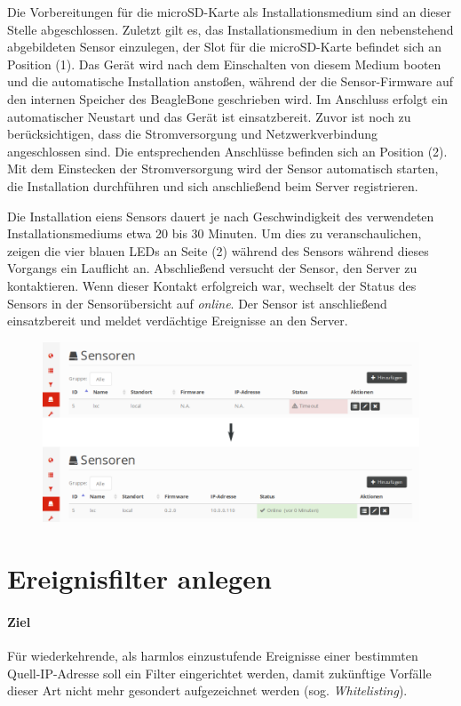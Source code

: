 \documentclass[12pt]{article}
\begin{document}
Die Vorbereitungen für die microSD-Karte als Installationsmedium sind an dieser Stelle abgeschlossen. Zuletzt gilt es, das Installationsmedium in den nebenstehend abgebildeten Sensor einzulegen, der Slot für die microSD-Karte befindet sich an Position (1). Das Gerät wird nach dem Einschalten von diesem Medium booten und die automatische Installation anstoßen, während der die Sensor-Firmware auf den internen Speicher des BeagleBone geschrieben wird. Im Anschluss erfolgt ein automatischer Neustart und das Gerät ist einsatzbereit. Zuvor ist noch zu berücksichtigen, dass die Stromversorgung und Netzwerkverbindung angeschlossen sind. Die entsprechenden Anschlüsse befinden sich an Position (2). Mit dem Einstecken der Stromversorgung wird der Sensor automatisch starten, die Installation durchführen und sich anschließend beim Server registrieren.

Die Installation eiens Sensors dauert je nach Geschwindigkeit des verwendeten Installationsmediums etwa 20 bis 30 Minuten. Um dies zu veranschaulichen, zeigen die vier blauen LEDs an Seite (2) während des Sensors während dieses Vorgangs ein Lauflicht an. Abschließend versucht der Sensor, den Server zu kontaktieren. Wenn dieser Kontakt erfolgreich war, wechselt der Status des Sensors in der Sensorübersicht auf \textit{online}. Der Sensor ist anschließend einsatzbereit und meldet verdächtige Ereignisse an den Server.

\begin{figure}[h]
				\centering
				\includegraphics[width=\textwidth]{./graphics/howto-sensor-add-5.png}
				\label{fig:howto-sensor-add-5}
\end{figure}

\newpage
\section{Ereignisfilter anlegen}
\paragraph{Ziel}
Für wiederkehrende, als harmlos einzustufende Ereignisse einer bestimmten Quell-IP-Adresse soll ein Filter eingerichtet werden, damit zukünftige Vorfälle dieser Art nicht mehr gesondert aufgezeichnet werden (sog. \textit{Whitelisting}).
\end{document}
